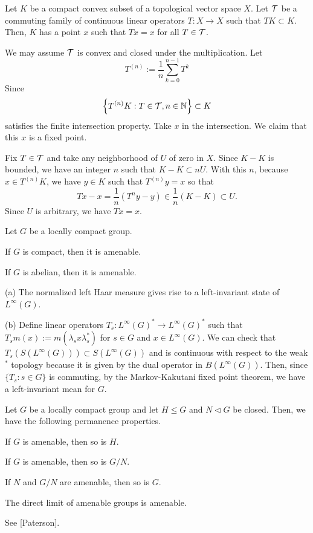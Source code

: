 \documentclass{../../small}
\begin{document}
\begin{lem}
Let $K$ be a compact convex subset of a topological vector space $X$.
Let $\mathcal{T}$ be a commuting family of continuous linear operators $T:X\to X$ such that $TK\subset K$.
Then, $K$ has a point $x$ such that $Tx=x$ for all $T\in\mathcal{T}$.
\end{lem}
\begin{pf}
We may assume $\mathcal{T}$ is convex and closed under the multiplication.
Let
\[T^{(n)}:=\frac1n\sum_{k=0}^{n-1}T^k\]
Since
\[\left\{T^{(n)}K:T\in\mathcal{T},n\in\mathbb{N}\right\}\subset K\]
satisfies the finite intersection property.
Take $x$ in the intersection.
We claim that this $x$ is a fixed point.

Fix $T\in\mathcal{T}$ and take any neighborhood of $U$ of zero in $X$.
Since $K-K$ is bounded, we have an integer $n$ such that $K-K\subset nU$.
With this $n$, because $x\in T^{(n)}K$, we have $y\in K$ such that $T^{(n)}y=x$ so that
\[Tx-x=\frac1n(T^ny-y)\in\frac1n(K-K)\subset U.\]
Since $U$ is arbitrary, we have $Tx=x$.
\end{pf}

\begin{prop}
Let $G$ be a locally compact group.
\begin{parts}
\item If $G$ is compact, then it is amenable.
\item If $G$ is abelian, then it is amenable.
\end{parts}
\end{prop}
\begin{pf}
(a)
The normalized left Haar measure gives rise to a left-invariant state of $L^\infty(G)$.

(b)
Define linear operators $T_s:L^\infty(G)^*\to L^\infty(G)^*$ such that $T_sm(x):=m(\lambda_sx\lambda_s^*)$ for $s\in G$ and $x\in L^\infty(G)$.
We can check that $T_s(S(L^\infty(G)))\subset S(L^\infty(G))$ and is continuous with respect to the weak$^*$ topology because it is given by the dual operator in $B(L^\infty(G))$.
Then, since $\{T_s:s\in G\}$ is commuting, by the Markov-Kakutani fixed point theorem, we have a left-invariant mean for $G$.
\end{pf}

\begin{prop}
Let $G$ be a locally compact group and let $H\le G$ and $N\lhd G$ be closed.
Then, we have the following permanence properties.
\begin{parts}
\item If $G$ is amenable, then so is $H$.
\item If $G$ is amenable, then so is $G/N$.
\item If $N$ and $G/N$ are amenable, then so is $G$.
\item The direct limit of amenable groups is amenable.
\end{parts}
\end{prop}
\begin{pf}
See [Paterson].
\end{pf}
\end{document}
